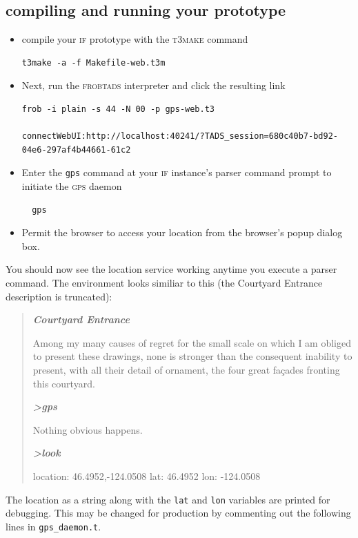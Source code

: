 \subsection{compiling and running your prototype}
\begin{itemize}[leftmargin=0em]
\item{compile your \textsc{if} prototype with the \textsc{t3make} command}
\begin{lstlisting}
t3make -a -f Makefile-web.t3m
\end{lstlisting}
\item{Next, run the \textsc{frobtads} interpreter and click the resulting link}
\begin{lstlisting}
frob -i plain -s 44 -N 00 -p gps-web.t3

connectWebUI:http://localhost:40241/?TADS_session=680c40b7-bd92-04e6-297af4b44661-61c2
\end{lstlisting}
\item{Enter the \texttt{gps} command at your \textsc{if} instance's parser command prompt to initiate the \textsc{gps} daemon}
\begin{lstlisting}
  gps
\end{lstlisting}
\item{Permit the browser to access your location from the browser's pop\textendash up dialog box.}
\end{itemize}
You should now see the location service working anytime you execute a parser
command. The environment looks similiar to this (the Courtyard Entrance description is truncated):
\begin{quote}
  \textbf{\emph{Courtyard Entrance}}
  
Among my many causes of regret for the small scale on which I am obliged to
present these drawings, none is stronger than the consequent inability to
present, with all their detail of ornament, the four great façades fronting this
courtyard.
\smallskip

\textbf{\emph{>﻿gps}}
\smallskip

Nothing obvious happens.
\smallskip

\textbf{\emph{>﻿look﻿}}
\smallskip

location: 46.4952,-124.0508 lat: 46.4952 lon: -124.0508 
\end{quote}
The location as a string along with the \texttt{lat} and \texttt{lon} variables
are printed for debugging. This may be changed for production by commenting out
the following lines in \texttt{\scriptsize{gps\_daemon.t}}.


